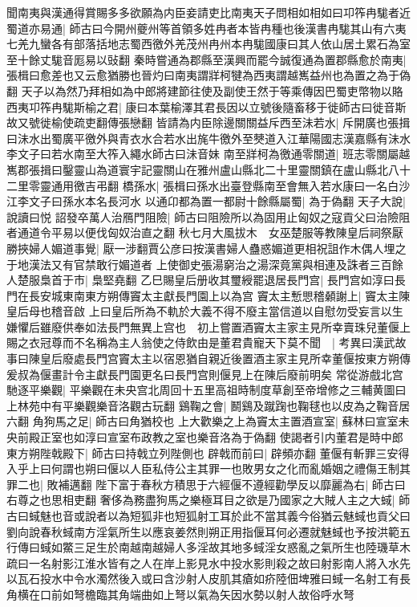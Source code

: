 聞南夷與漢通得賞賜多多欲願為内臣妾請吏比南夷天子問相如相如曰卭筰冉駹者近蜀道亦易通|{
	師古曰今開州夔州等首領多姓冉者本皆冉種也後漢書冉駹其山有六夷七羌九蠻各有部落括地志蜀西徼外羌茂州冉州本冉駹國康曰其人依山居土累石為室至十餘丈駹音厖易以䜴翻}
秦時嘗通為郡縣至漢興而罷今誠復通為置郡縣愈於南夷|{
	張楫曰愈差也又云愈猶勝也晉灼曰南夷謂牂柯犍為西夷謂越嶲益州也為置之為于偽翻}
天子以為然乃拜相如為中郎將建節往使及副使王然于等乘傳因巴蜀吏幣物以賂西夷卭筰冉駹斯榆之君|{
	康曰本葉榆澤其君長因以立號後隨畜移于徙師古曰徙音斯故又號徙榆使疏吏翻傳張戀翻}
皆請為内臣除邊關關益斥西至沬若水|{
	斥開廣也張揖曰沬水出蜀廣平徼外與青衣水合若水出旄牛徼外至僰道入江華陽國志漢嘉縣有沬水李文子曰若水南至大筰入繩水師古曰沬音妹}
南至牂柯為徼通零關道|{
	班志零關屬越嶲郡張揖曰鑿靈山為道寰宇記靈關山在雅州盧山縣北二十里靈關鎮在盧山縣北八十二里零靈通用徼吉弔翻}
橋孫水|{
	張楫曰孫水出臺登縣南至會無入若水康曰一名白沙江李文子曰孫水本名長河水}
以通卬都為置一都尉十餘縣屬蜀|{
	為于偽翻}
天子大說|{
	說讀曰悦}
詔發卒萬人治鴈門阻險|{
	師古曰阻險所以為固用止匈奴之寇貢父曰治險阻者通道令平易以便伐匈奴治直之翻}
秋七月大風拔木　女巫楚服等教陳皇后祠祭厭勝挾婦人媚道事覺|{
	厭一涉翻賈公彦曰按漢書婦人蠱惑媚道更相祝詛作木偶人埋之于地漢法又有官禁敢行媚道者}
上使御史張湯窮治之湯深竟黨與相連及誅者三百餘人楚服梟首于市|{
	梟堅堯翻}
乙巳賜皇后册收其璽綬罷退居長門宫|{
	長門宫如淳曰長門在長安城東南東方朔傳竇太主獻長門園上以為宫}
竇太主慙愳稽顙謝上|{
	竇太主陳皇后母也稽音啟}
上曰皇后所為不軌於大義不得不廢主當信道以自慰勿受妄言以生嫌懼后雖廢供奉如法長門無異上宫也　初上嘗置酒竇太主家主見所幸賣珠兒董偃上賜之衣冠尊而不名稱為主人翁使之侍飲由是董君貴寵天下莫不聞　|{
	考異曰漢武故事曰陳皇后廢處長門宫竇太主以宿恩猶自親近後置酒主家主見所幸董偃按東方朔傳爰叔為偃畫計令主獻長門園更名曰長門宫則偃見上在陳后廢前明矣}
常從游戲北宫馳逐平樂觀|{
	平樂觀在未央宫北周回十五里高祖時制度草創至帝增修之三輔黄圖曰上林苑中有平樂觀樂音洛觀古玩翻}
鷄鞠之會|{
	鬭鷄及蹴踘也鞠毬也以皮為之鞠音居六翻}
角狗馬之足|{
	師古曰角猶校也}
上大歡樂之上為竇太主置酒宣室|{
	蘇林曰宣室未央前殿正室也如淳曰宣室布政教之室也樂音洛為于偽翻}
使謁者引内董君是時中郎東方朔陛戟殿下|{
	師古曰持戟立列陛側也}
辟戟而前曰|{
	辟頻亦翻}
董偃有斬罪三安得入乎上曰何謂也朔曰偃以人臣私侍公主其罪一也敗男女之化而亂婚姻之禮傷王制其罪二也|{
	敗補邁翻}
陛下富于春秋方積思于六經偃不遵經勸學反以靡麗為右|{
	師古曰右尊之也思相吏翻}
奢侈為務盡狗馬之樂極耳目之欲是乃國家之大賊人主之大蜮|{
	師古曰蜮魅也音或說者以為短狐非也短狐射工耳於此不當其義今俗猶云魅蜮也貢父曰劉向說春秋蜮南方淫氣所生以應哀姜然則朔正用指偃耳何必遷就魅蜮也予按洪範五行傳曰蜮如鱉三足生於南越南越婦人多淫故其地多蜮淫女惑亂之氣所生也陸璣草木疏曰一名射影江淮水皆有之人在岸上影見水中投水影則殺之故曰射影南人將入水先以瓦石投水中令水濁然後入或曰含沙射人皮肌其瘡如疥陸佃埤雅曰蜮一名射工有長角横在口前如弩檐臨其角端曲如上弩以氣為矢因水勢以射人故俗呼水弩}
